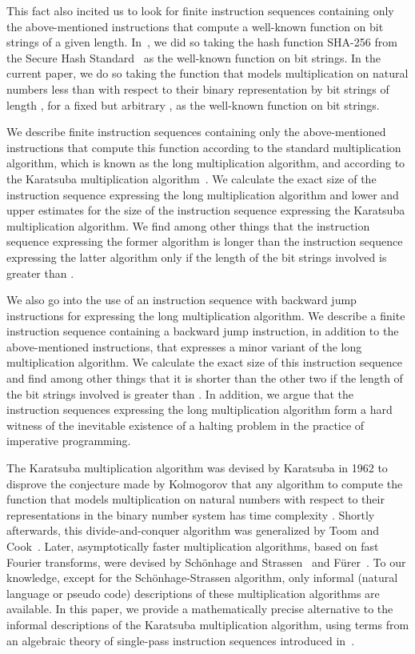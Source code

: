 \documentclass{llncs}
\begin{document}
This fact also incited us to look for finite instruction sequences 
containing only the above-mentioned instructions that compute a 
well-known function on bit strings of a given length.
In~\cite{BM13b}, we did so taking the hash function SHA-256 from the 
Secure Hash Standard~\cite{NIST12a} as the well-known function on bit 
strings.
In the current paper, we do so taking the function that models 
multiplication on natural numbers less than  with respect to their 
binary representation by bit strings of length , for a fixed but 
arbitrary , as the well-known function on bit strings.

We describe finite instruction sequences containing only the 
above-mentioned instructions that compute this function according to the 
standard multiplication algorithm, which is known as the long 
multiplication algorithm, and according to the Karatsuba multiplication 
algorithm~\cite{Kar95a,KO62a}.
We calculate the exact size of the instruction sequence expressing the 
long multiplication algorithm and lower and upper estimates for the size
of the instruction sequence expressing the Karatsuba multiplication 
algorithm.
We find among other things that the instruction sequence expressing the 
former algorithm is longer than the instruction sequence expressing the 
latter algorithm  only if the length of the bit strings involved is 
greater than .

We also go into the use of an instruction sequence with backward jump 
instructions for expressing the long multiplication algorithm.
We describe a finite instruction sequence containing a backward jump 
instruction, in addition to the above-mentioned instructions, that 
expresses a minor variant of the long multiplication algorithm.
We calculate the exact size of this instruction sequence and find among 
other things that it is shorter than the other two if the length of the 
bit strings involved is greater than .
In addition, we argue that the instruction sequences expressing the
long multiplication algorithm form a hard witness of the inevitable 
existence of a halting problem in the practice of impera\-tive
programming.

The Karatsuba multiplication algorithm was devised by Karatsuba in 1962 
to disprove the conjecture made by Kolmogorov that any algorithm to 
compute the function that models multiplication on natural numbers with
respect to their representations in the binary number system has time 
complexity .
Shortly afterwards, this divide-and-conquer algorithm was generalized by 
Toom and Cook~\cite{Coo66a,Too63a}.
Later, asymptotically faster multiplication algorithms, based on fast 
Fourier transforms, were devised by Sch\"{o}nhage and 
Strassen~\cite{SS71a} and F\"{u}rer~\cite{Fur09a}.
To our knowledge, except for the Sch\"{o}nhage-Strassen algorithm, only 
informal (natural language or pseudo code) descriptions of these 
multiplication algorithms are available.
In this paper, we provide a mathematically precise alternative to the
informal descriptions of the Karatsuba multiplication algorithm, using
terms from an algebraic theory of single-pass instruction sequences
introduced in~\cite{BL02a}.
\end{document}

